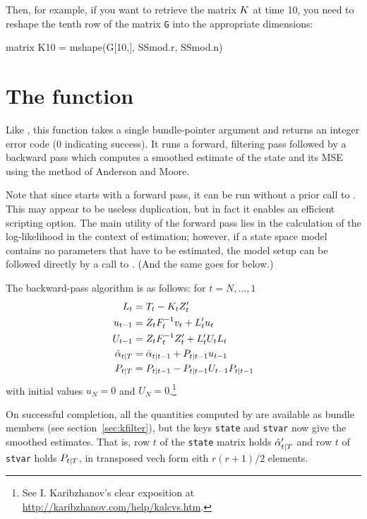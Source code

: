 Then, for example, if you want to retrieve the matrix $K$ at time
10, you need to reshape the tenth row of the matrix \texttt{G} into
the appropriate dimensions:
\begin{code}
matrix K10 = mshape(G[10,], SSmod.r, SSmod.n)
\end{code}

\section{The  function}
\label{sec:ksmooth}

Like , this function takes a single bundle-pointer
argument and returns an integer error code (0 indicating success).  It
runs a forward, filtering pass followed by a backward pass which
computes a smoothed estimate of the state and its MSE using the method
of Anderson and Moore.

Note that since  starts with a forward pass, it can be
run without a prior call to . This may appear to be
useless duplication, but in fact it enables an efficient scripting
option.  The main utility of the forward pass lies in the calculation
of the log-likelihood in the context of estimation; however, if a
state space model contains no parameters that have to be estimated,
the model setup can be followed directly by a call to
. (And the same goes for  below.)

The backward-pass algorithm is as follows: for $t=N,\dots,1$
%
\begin{align*}
L_t &= T_t - K_t Z_t' \\
u_{t-1} &= Z_t F_t^{-1} v_t
 + L_t' u_t \\
U_{t-1} &= Z_t F_t^{-1} Z_t' +
  L_t' U_t L_t \\
\hat{\alpha}_{t|T} &= \hat{\alpha}_{t|t-1} +
  P_{t|t-1} u_{t-1} \\
P_{t|T} &= P_{t|t-1} -
  P_{t|t-1} U_{t-1} P_{t|t-1}
\end{align*}
%
with initial values $u_N = 0$ and $U_N =
0$.\footnote{See I. Karibzhanov's clear exposition at
\url{http://karibzhanov.com/help/kalcvs.htm}.}

On successful completion, all the quantities computed by
 are available as bundle members (see
section~\ref{sec:kfilter}), but the keys \texttt{state} and
\texttt{stvar} now give the smoothed estimates.  That is, row $t$ of
the \texttt{state} matrix holds $\hat{\alpha}_{t|T}'$ and row $t$
of \texttt{stvar} holds $P_{t|T}$, in transposed vech form
eith $r(r+1)/2$ elements.

